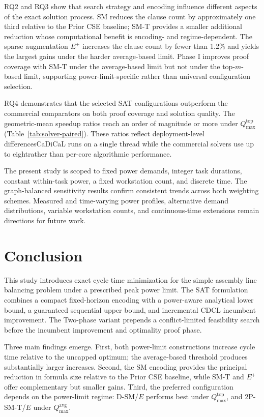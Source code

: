 \documentclass[]{interact}
\theoremstyle{plain}
\theoremstyle{definition}
\theoremstyle{remark}
\begin{document}
RQ2 and RQ3 show that search strategy and encoding influence different aspects of the exact solution process. SM reduces the clause count by approximately one third relative to the Prior CSE baseline; SM-T provides a smaller additional reduction whose computational benefit is encoding- and regime-dependent. The sparse augmentation $E^+$ increases the clause count by fewer than 1.2\% and yields the largest gains under the harder average-based limit. Phase I improves proof coverage with SM-T under the average-based limit but not under the top-$m$-based limit, supporting power-limit-specific rather than universal configuration selection.

RQ4 demonstrates that the selected SAT configurations outperform the commercial comparators on both proof coverage and solution quality. The geometric-mean speedup ratios reach an order of magnitude or more under $Q_{\max}^{\mathrm{top}}$ (Table~\ref{tab:solver-paired}). These ratios reflect deployment-level differences\textemdash{}CaDiCaL runs on a single thread while the commercial solvers use up to eight\textemdash{}rather than per-core algorithmic performance.

The present study is scoped to fixed power demands, integer task durations, constant within-task power, a fixed workstation count, and discrete time. The graph-balanced sensitivity results confirm consistent trends across both weighting schemes. Measured and time-varying power profiles, alternative demand distributions, variable workstation counts, and continuous-time extensions remain directions for future work.

\section{Conclusion}

This study introduces exact cycle time minimization for the simple assembly line balancing problem under a prescribed peak power limit. The SAT formulation combines a compact fixed-horizon encoding with a power-aware analytical lower bound, a guaranteed sequential upper bound, and incremental CDCL incumbent improvement. The Two-phase variant prepends a conflict-limited feasibility search before the incumbent improvement and optimality proof phase.

Three main findings emerge. First, both power-limit constructions increase cycle time relative to the uncapped optimum; the average-based threshold produces substantially larger increases. Second, the SM encoding provides the principal reduction in formula size relative to the Prior CSE baseline, while SM-T and $E^+$ offer complementary but smaller gains. Third, the preferred configuration depends on the power-limit regime: D-SM/$E$ performs best under $Q_{\max}^{\mathrm{top}}$, and 2P-SM-T/$E$ under $Q_{\max}^{\mathrm{avg}}$.
\end{document}
